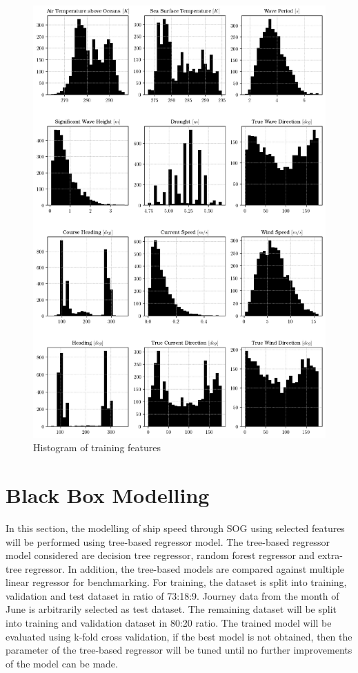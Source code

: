 \begin{figure}
    \centering
    \includegraphics[width=.9\linewidth]{02_figures/hist_init_preprocessing.png}
    \caption{Histogram of training features}
    \label{fig:hist_training_ftr_label}
\end{figure}

\section{Black Box Modelling}\label{sec:BBM_modelling}

In this section, the modelling of ship speed through SOG using selected features will be performed using tree-based regressor model. The tree-based regressor model considered are decision tree regressor, random forest regressor and extra-tree regressor. In addition, the tree-based models are compared against multiple linear regressor for benchmarking. For training, the dataset is split into training, validation and test dataset in ratio of 73:18:9. Journey data from the month of June is arbitrarily selected as test dataset. The remaining dataset will be split into training and validation dataset in 80:20 ratio. The trained model will be evaluated using k-fold cross validation, if the best model is not obtained, then the parameter of the tree-based regressor will be tuned until no further improvements of the model can be made.\\


